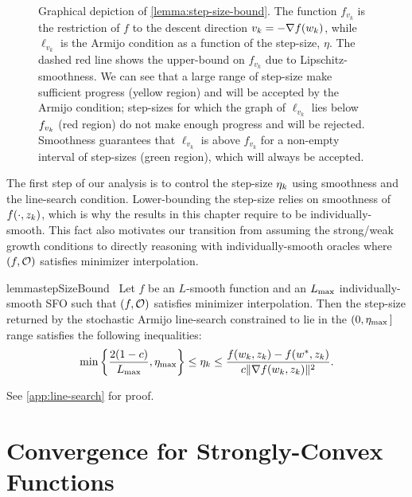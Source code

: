 \begin{figure}[t]
    \centering
    
    \caption[Step-size intervals accepted and rejected by the Armijo line-search for a Lipschitz-smooth function.]%
       {Graphical depiction of \autoref{lemma:step-size-bound}.
        The function \( f_{v_k} \) is the restriction of \( f \) to the descent direction \( v_k = -\grad(\wk) \), while \( \ell_{v_k} \) is the Armijo condition as a function of the step-size, \( \eta \).
        The dashed red line shows the upper-bound on \( f_{v_k} \) due to Lipschitz-smoothness.
        We can see that a large range of step-size make sufficient progress (yellow region) and will be accepted by the Armijo condition; step-sizes for which the graph of \( \ell_{v_k} \) lies below \( f_{\vk} \) (red region) do not make enough progress and will be rejected. 
        Smoothness guarantees that \( \ell_{v_k} \) is above \( f_{v_k} \) for a non-empty interval of step-sizes (green region), which will always be accepted.%
    }%
    \label{fig:step-size-bound}
\end{figure}

The first step of our analysis is to control the step-size \( \etak \) using smoothness and the line-search condition.
Lower-bounding the step-size relies on smoothness of \( f(\cdot, \zk) \), which is why the results in this chapter require \oracle{} to be individually-smooth. 
This fact also motivates our transition from assuming the strong/weak growth conditions to directly reasoning with individually-smooth oracles where \( \rbr{f, \oracle{}} \) satisfies minimizer interpolation.
\begin{restatable}{lemma}{stepSizeBound}~\label{lemma:step-size-bound}
    Let \( f \) be an \( L \)-smooth function and \oracle{} an \( \Lmax \) individually-smooth \ac{SFO} such that \( \rbr{f, \oracle{}} \) satisfies minimizer interpolation. 
    Then the step-size returned by the stochastic Armijo line-search constrained to lie in the \( (0, \etamax \, ] \) range satisfies the following inequalities:
    \[ \min\cbr{\frac{2 (1-c)}{\Lmax}, \etamax} \leq \etak \leq \frac{f(\wk, \zk) - f(\wopt, \zk)}{c \norm{\grad(\wk, \zk)}^2}. \]
\end{restatable}
\noindent See \autoref{app:line-search} for proof.

\section{Convergence for Strongly-Convex Functions}~\label{sec:ls-sc}

